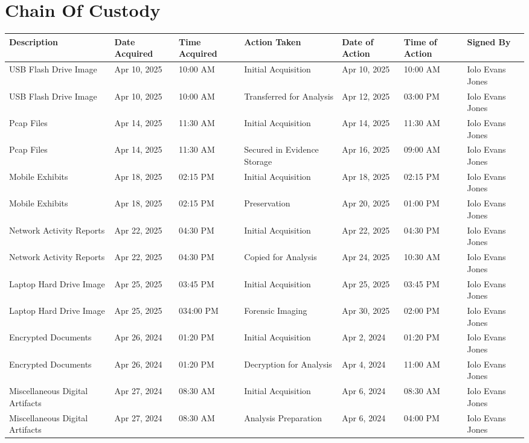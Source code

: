 
\chapter{Chain Of Custody}

\begin{longtable}{|p{2.5cm}|p{2cm}|p{2cm}|p{2.5cm}|p{2cm}|p{2cm}|p{2cm}|}
  \hline
  \textbf{Description} & \textbf{Date Acquired} & \textbf{Time Acquired} & \textbf{Action Taken} & \textbf{Date of Action} & \textbf{Time of Action} & \textbf{Signed By} \\
  \hline
  \endhead
  
  USB Flash Drive Image & Apr 10, 2025 & 10:00 AM & Initial Acquisition & Apr 10, 2025 & 10:00 AM & Iolo Evans Jones \\
  \hline
  USB Flash Drive Image & Apr 10, 2025 & 10:00 AM & Transferred for Analysis & Apr 12, 2025 & 03:00 PM & Iolo Evans Jones \\
  \hline
  Pcap Files & Apr 14, 2025 & 11:30 AM & Initial Acquisition & Apr 14, 2025 & 11:30 AM & Iolo Evans Jones \\
  \hline
  Pcap Files & Apr 14, 2025 & 11:30 AM & Secured in Evidence Storage & Apr 16, 2025 & 09:00 AM & Iolo Evans Jones \\
  \hline
  Mobile Exhibits & Apr 18, 2025 & 02:15 PM & Initial Acquisition & Apr 18, 2025 & 02:15 PM & Iolo Evans Jones \\
  \hline
  Mobile Exhibits & Apr 18, 2025 & 02:15 PM & Preservation & Apr 20, 2025 & 01:00 PM & Iolo Evans Jones \\
  \hline
  Network Activity Reports & Apr 22, 2025 & 04:30 PM & Initial Acquisition & Apr 22, 2025 & 04:30 PM & Iolo Evans Jones \\
  \hline
  Network Activity Reports & Apr 22, 2025 & 04:30 PM & Copied for Analysis & Apr 24, 2025 & 10:30 AM & Iolo Evans Jones \\
  \hline
  Laptop Hard Drive Image & Apr 25, 2025 & 03:45 PM & Initial Acquisition & Apr 25, 2025 & 03:45 PM & Iolo Evans Jones \\
  \hline
  Laptop Hard Drive Image & Apr 25, 2025 & 034:00 PM & Forensic Imaging & Apr 30, 2025 & 02:00 PM & Iolo Evans Jones \\
  \hline
  Encrypted Documents & Apr 26, 2024 & 01:20 PM & Initial Acquisition & Apr 2, 2024 & 01:20 PM & Iolo Evans Jones \\
  \hline
  Encrypted Documents & Apr 26, 2024 & 01:20 PM & Decryption for Analysis & Apr 4, 2024 & 11:00 AM & Iolo Evans Jones \\
  \hline
  Miscellaneous Digital Artifacts & Apr 27, 2024 & 08:30 AM & Initial Acquisition & Apr 6, 2024 & 08:30 AM & Iolo Evans Jones \\
  \hline
  Miscellaneous Digital Artifacts & Apr 27, 2024 & 08:30 AM & Analysis Preparation & Apr 6, 2024 & 04:00 PM & Iolo Evans Jones \\
  \hline
  \end{longtable}